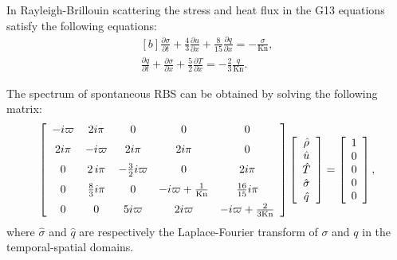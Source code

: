 

In Rayleigh-Brillouin scattering the stress and heat flux in the G13 equations satisfy the following equations:
\begin{equation}\label{G13}
\begin{aligned}[b]
\frac{\partial \sigma}{\partial t}+\frac{4}{3}\frac{\partial u}{\partial x}+\frac{8}{15}\frac{\partial q}{\partial x}=-\frac{\sigma}{\text{Kn}},\\
\frac{\partial q}{\partial t}+\frac{\partial \sigma}{\partial x}+\frac{5}{2}\frac{\partial {T}}{\partial x}=-\frac{2}{3}\frac{q}{\text{Kn}}.
\end{aligned}
\end{equation}

The spectrum of spontaneous RBS can be obtained by solving the following matrix:
\begin{equation}\label{Grad_sp}
\left[ \begin {array}{cccccc} 
-i\varpi&2i\pi&0 &0 &0
\\ \noalign{\medskip}
2i\pi&-i\varpi &2i\pi &2i\pi &0
\\ \noalign{\medskip}
0&2\,i\pi&-\frac{3}{2}i\varpi &0 &2i\pi
\\ \noalign{\medskip}
0  &\frac{8}{3}i\pi  & 0 &-i\varpi+\frac{1}{\text{Kn}}  &\frac{16}{15}i\pi
\\ \noalign{\medskip}
0  & 0 & 5i\varpi &2i\varpi  &-i\varpi+\frac{2}{3\text{Kn}}
\end {array} \right]
\left[ \begin {array}{cccccc} \hat\rho \\ \hat{u}
\\ \hat{T}  \\ \hat\sigma \\ \hat{q}
\end {array} \right] =
\left[ \begin {array}{cccc} 1\\ 0
\\ 0 \\0 \\0
\end {array} \right], 
\end{equation}	
where $\hat{\sigma}$ and $\hat{q}$ are respectively the Laplace-Fourier transform of $\sigma$ and $q$ in the temporal-spatial domains.

